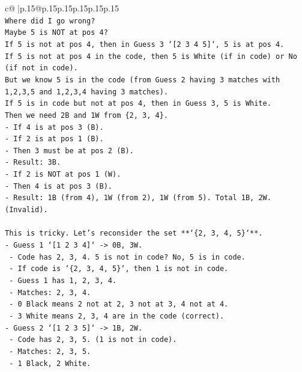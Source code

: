 \documentclass{article}
\begin{document}
{\begin{supertabular}{c@{$\;$}|p{.15\linewidth}@{}p{.15\linewidth}p{.15\linewidth}p{.15\linewidth}p{.15\linewidth}p{.15\linewidth}}
{{{\\ 
\texttt{Where did I go wrong?} \\
\texttt{Maybe 5 is NOT at pos 4?} \\
\texttt{If 5 is not at pos 4, then in Guess 3 `{[}2 3 4 5{]}`, 5 is at pos 4.} \\
\texttt{If 5 is not at pos 4 in the code, then 5 is White (if in code) or No (if not in code).} \\
\texttt{But we know 5 is in the code (from Guess 2 having 3 matches with 1,2,3,5 and 1,2,3,4 having 3 matches).} \\
\texttt{If 5 is in code but not at pos 4, then in Guess 3, 5 is White.} \\
\texttt{Then we need 2B and 1W from \{2, 3, 4\}.} \\
\texttt{{-} If 4 is at pos 3 (B).} \\
\texttt{{-} If 2 is at pos 1 (B).} \\
\texttt{{-} Then 3 must be at pos 2 (B).} \\
\texttt{{-} Result: 3B.} \\
\texttt{{-} If 2 is NOT at pos 1 (W).} \\
\texttt{{-} Then 4 is at pos 3 (B).} \\
\texttt{{-} Result: 1B (from 4), 1W (from 2), 1W (from 5). Total 1B, 2W. (Invalid).} \\
\\ 
\texttt{This is tricky. Let's reconsider the set **`\{2, 3, 4, 5\}`**.} \\
\texttt{{-} Guess 1 `{[}1 2 3 4{]}` {-}> 0B, 3W.} \\
\texttt{  {-} Code has 2, 3, 4. 5 is not in code? No, 5 is in code.} \\
\texttt{  {-} If code is `\{2, 3, 4, 5\}`, then 1 is not in code.} \\
\texttt{  {-} Guess 1 has 1, 2, 3, 4.} \\
\texttt{  {-} Matches: 2, 3, 4.} \\
\texttt{  {-} 0 Black means 2 not at 2, 3 not at 3, 4 not at 4.} \\
\texttt{  {-} 3 White means 2, 3, 4 are in the code (correct).} \\
\texttt{{-} Guess 2 `{[}1 2 3 5{]}` {-}> 1B, 2W.} \\
\texttt{  {-} Code has 2, 3, 5. (1 is not in code).} \\
\texttt{  {-} Matches: 2, 3, 5.} \\
\texttt{  {-} 1 Black, 2 White.} \\
}}}
\end{supertabular}}
\end{document}
